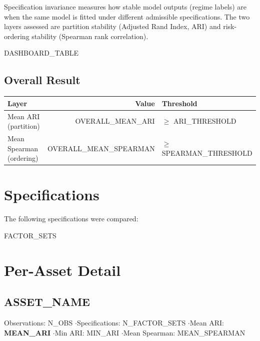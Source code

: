 \documentclass[11pt,a4paper]{article}
\begin{document}
Specification invariance measures how stable model outputs (regime labels)
are when the same model is fitted under different admissible specifications.
The two layers assessed are partition stability (Adjusted Rand Index, ARI)
and risk-ordering stability (Spearman rank correlation).

{{DASHBOARD_TABLE}}

\subsection{Overall Result}

\begin{center}
\renewcommand{\arraystretch}{1.4}
\begin{tabular}{lrl}
\toprule
\textbf{Layer} & \textbf{Value} & \textbf{Threshold} \\
\midrule
Mean ARI (partition)      & {{OVERALL_MEAN_ARI}}      & $\geq$ {{ARI_THRESHOLD}} \\
Mean Spearman (ordering)  & {{OVERALL_MEAN_SPEARMAN}} & $\geq$ {{SPEARMAN_THRESHOLD}} \\
\bottomrule
\end{tabular}
\end{center}


\section{Specifications}

The following specifications were compared:

{{FACTOR_SETS}}


\section{Per-Asset Detail}

\subsection{{{ASSET_NAME}}}

\noindent
Observations: {{N_OBS}} \quad$\cdot$\quad Specifications: {{N_FACTOR_SETS}}
\quad$\cdot$\quad Mean ARI: \textcolor{{{ARI_COLOR}}}{\textbf{{{MEAN_ARI}}}}
\quad$\cdot$\quad Min ARI: {{MIN_ARI}}
\quad$\cdot$\quad Mean Spearman: {{MEAN_SPEARMAN}}
\end{document}
